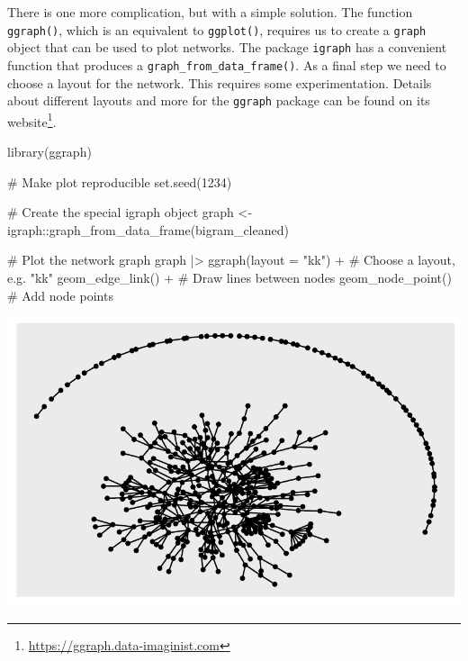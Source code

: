 \documentclass[
  letterpaper,
]{krantz}
\makeatletter
\newenvironment{Shaded}{\begin{snugshade}}{\end{snugshade}}
\newcommand{\AttributeTok}[1]{\textcolor[rgb]{0.40,0.45,0.13}{#1}}
\newcommand{\CommentTok}[1]{\textcolor[rgb]{0.37,0.37,0.37}{#1}}
\newcommand{\DecValTok}[1]{\textcolor[rgb]{0.68,0.00,0.00}{#1}}
\newcommand{\FunctionTok}[1]{\textcolor[rgb]{0.28,0.35,0.67}{#1}}
\newcommand{\NormalTok}[1]{\textcolor[rgb]{0.00,0.23,0.31}{#1}}
\newcommand{\OtherTok}[1]{\textcolor[rgb]{0.00,0.23,0.31}{#1}}
\newcommand{\SpecialCharTok}[1]{\textcolor[rgb]{0.37,0.37,0.37}{#1}}
\newcommand{\StringTok}[1]{\textcolor[rgb]{0.13,0.47,0.30}{#1}}
\renewcommand{\href}[2]{#2\footnote{\url{#1}}}
\newenvironment{kframe}{%
\medskip{}
\setlength{\fboxsep}{.8em}
 \def\at@end@of@kframe{}%
 \ifinner\ifhmode%
  \def\at@end@of@kframe{\end{minipage}}%
  \begin{minipage}{\columnwidth}%
 \fi\fi%
 \def\FrameCommand##1{\hskip\@totalleftmargin \hskip-\fboxsep
 \colorbox{shadecolor}{##1}\hskip-\fboxsep
     \hskip-\linewidth \hskip-\@totalleftmargin \hskip\columnwidth}%
 \MakeFramed {\advance\hsize-\width
   \@totalleftmargin\z@ \linewidth\hsize
   \@setminipage}}%
 {\par\unskip\endMakeFramed%
 \at@end@of@kframe}
\renewenvironment{Shaded}{\begin{kframe}}{\end{kframe}}
\makeatother
\begin{document}
There is one more complication, but with a simple solution. The function
\texttt{ggraph()}, which is an equivalent to \texttt{ggplot()}, requires
us to create a \texttt{graph} object that can be used to plot networks.
The package \texttt{igraph} has a convenient function that produces a
\texttt{graph\_from\_data\_frame()}. As a final step we need to choose a
layout for the network. This requires some experimentation. Details
about different layouts and more for the \texttt{ggraph} package can be
found on its \href{https://ggraph.data-imaginist.com}{website}.

\begin{Shaded}
\begin{Highlighting}[]
\FunctionTok{library}\NormalTok{(ggraph)}

\CommentTok{\# Make plot reproducible}
\FunctionTok{set.seed}\NormalTok{(}\DecValTok{1234}\NormalTok{)}

\CommentTok{\# Create the special igraph object}
\NormalTok{graph }\OtherTok{\textless{}{-}}\NormalTok{ igraph}\SpecialCharTok{::}\FunctionTok{graph\_from\_data\_frame}\NormalTok{(bigram\_cleaned)}

\CommentTok{\# Plot the network graph}
\NormalTok{graph }\SpecialCharTok{|\textgreater{}}
  \FunctionTok{ggraph}\NormalTok{(}\AttributeTok{layout =} \StringTok{"kk"}\NormalTok{) }\SpecialCharTok{+}  \CommentTok{\# Choose a layout, e.g. "kk"}
  \FunctionTok{geom\_edge\_link}\NormalTok{() }\SpecialCharTok{+}       \CommentTok{\# Draw lines between nodes}
  \FunctionTok{geom\_node\_point}\NormalTok{()        }\CommentTok{\# Add node points}
\end{Highlighting}
\end{Shaded}

\includegraphics{14_mixed_methods_files/figure-pdf/ngrams-network-plot-step-one-1.pdf}
\end{document}
